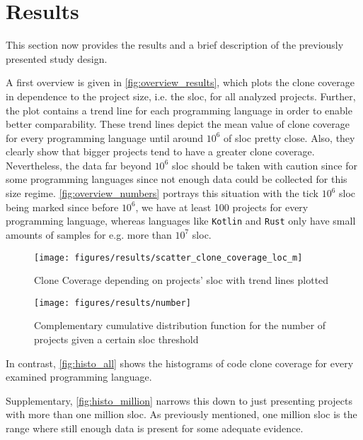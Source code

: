 
\section{Results}
\label{sec:results}

This section now provides the results and a brief description of the previously presented study design. 


A first overview is given in \autoref{fig:overview_results}, which plots the clone coverage in dependence to the project size, i.e. the \acl{sloc}, for all analyzed projects. Further, the plot contains a trend line for each programming language in order to enable better comparability. These trend lines depict the mean value of clone coverage for every programming language until around $10^6$ of \ac{sloc} pretty close. Also, they clearly show that bigger projects tend to have a greater clone coverage.
Nevertheless, the data far beyond $10^6$ \acl{sloc} should be taken with caution since for some programming languages since not enough data could be collected for this size regime. 
\autoref{fig:overview_numbers} portrays this situation with the tick $10^6$ \ac{sloc} being marked since before $10^6$, we have at least 100 projects for every programming language, whereas languages like \texttt{Kotlin} and \texttt{Rust} only have small amounts of samples for e.g. more than $10^7$ \ac{sloc}.

\begin{figure}[tbh!]
	\centering
	\texttt{[image: figures/results/scatter\_clone\_coverage\_loc\_m]}
	\caption{Clone Coverage depending on projects' \ac{sloc} with trend lines plotted}
	\label{fig:overview_results}
\end{figure}

\begin{figure}[tbh!]
	\centering
	\texttt{[image: figures/results/number]}
	\caption{Complementary cumulative distribution function for the number of projects given a certain \ac{sloc} threshold}
	\label{fig:overview_numbers}
\end{figure}

In contrast, \autoref{fig:histo_all} shows the histograms of code clone coverage for every examined programming language.


Supplementary, \autoref{fig:histo_million} narrows this down to just presenting projects with more than one million \acl{sloc}. As previously mentioned, one million \ac{sloc} is the range where still enough data is present for some adequate evidence.

